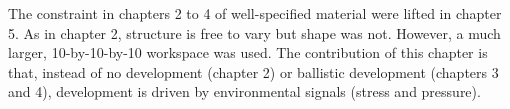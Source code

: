 \noindent
The constraint in chapters 2 to 4 of well-specified material were lifted in chapter 5.
As in chapter 2,
structure is free to vary but shape was not.
However, a much larger, 10-by-10-by-10 workspace was used.
The contribution of this chapter is that,
instead of no development (chapter 2) or ballistic development (chapters 3 and 4),
development is driven by environmental signals (stress and pressure).






